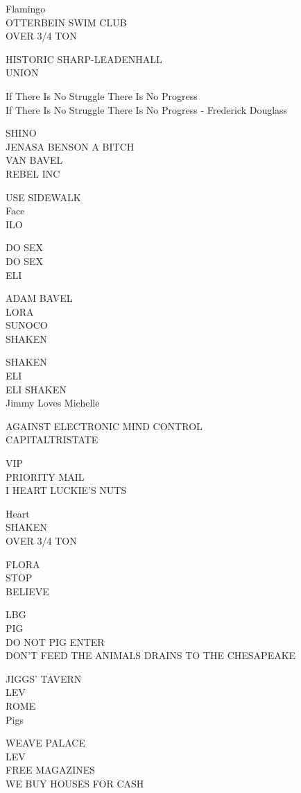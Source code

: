\documentclass[10pt,letterpaper]{article}
\begin{document}
Flamingo\\
OTTERBEIN SWIM CLUB\\
OVER 3/4 TON

HISTORIC SHARP{-}LEADENHALL\\
UNION

If There Is No Struggle There Is No Progress\\
If There Is No Struggle There Is No Progress {-} Frederick Douglass

SHINO\\
JENASA BENSON A BITCH\\
VAN BAVEL\\
REBEL INC

USE SIDEWALK\\
Face\\
ILO

DO SEX\\
DO SEX\\
ELI

ADAM BAVEL\\
LORA\\
SUNOCO\\
SHAKEN

SHAKEN\\
ELI\\
ELI SHAKEN\\
Jimmy Loves Michelle

AGAINST ELECTRONIC MIND CONTROL\\
CAPITALTRISTATE

VIP\\
PRIORITY MAIL\\
I HEART LUCKIE'S NUTS

Heart\\
SHAKEN\\
OVER 3/4 TON

FLORA\\
STOP\\
BELIEVE

LBG\\
PIG\\
DO NOT PIG ENTER\\
DON'T FEED THE ANIMALS DRAINS TO THE CHESAPEAKE

JIGGS' TAVERN\\
LEV\\
ROME\\
Pigs

WEAVE PALACE\\
LEV\\
FREE MAGAZINES\\
WE BUY HOUSES FOR CASH
\end{document}
